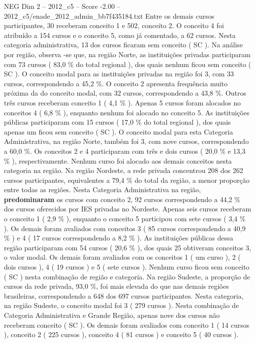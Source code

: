 \begin{textsample}{NEG Dim 2 – 2012\_c5 – Score -2.00 – 2012\_c5/enade\_2012\_admin\_bb7f435184.txt}
Entre os demais cursos participantes, 30 receberam conceito 1 e 502, conceito 2.
O conceito 4 foi atribuído a 154 cursos e o conceito 5, como já comentado, a 62 cursos.
Nesta categoria administrativa, 13 dos cursos ficaram sem conceito ( SC ).
Na análise por região, observa -se que, na região Norte, as instituições privadas participaram com 73 cursos ( 83,0 \% do total regional ), dos quais nenhum ficou sem conceito ( SC ).
O conceito modal para as instituições privadas na região foi 3, com 33 cursos, correspondendo a 45,2 \%.
O conceito 2 apresenta frequência muito próxima da do conceito modal, com 32 cursos, correspondendo a 43,8 \%.
Outros três cursos receberam conceito 1 ( 4,1 \% ).
Apenas 5 cursos foram alocados no conceitos 4 ( 6,8 \% ), enquanto nenhum foi alocado no conceito 5.
As instituições públicas participaram com 15 cursos ( 17,0 \% do total regional ), dos quais apenas um ficou sem conceito ( SC ).
O conceito modal para esta Categoria Administrativa, na região Norte, também foi 3, com nove cursos, correspondendo a 60,0 \%.
Os conceitos 2 e 4 participaram com três e dois cursos ( 20,0 \% e 13,3 \% ), respectivamente.
Nenhum curso foi alocado aos demais conceitos nesta categoria na região.
Na região Nordeste, a rede privada concentrou 208 dos 262 cursos participantes, equivalentes a 79,4 \% do total da região, a menor proporção entre todas as regiões.
Nesta Categoria Administrativa na região, \textbf{predominaram} os cursos com conceito 2, 92 cursos correspondendo a 44,2 \% dos cursos oferecidos por IES privadas no Nordeste.
Apenas seis cursos receberam o conceito 1 ( 2,9 \% ), enquanto o conceito 5 participou com sete cursos ( 3,4 \% ).
Os demais foram avaliados com conceitos 3 ( 85 cursos correspondendo a 40,9 \% ) e 4 ( 17 cursos correspondendo a 8,2 \% ).
As instituições públicas dessa região participaram com 54 cursos ( 20,6 \% ), dos quais 25 obtiveram conceitos 3, o valor modal.
Os demais foram avaliados com os conceitos 1 ( um curso ), 2 ( dois cursos ), 4 ( 19 cursos ) e 5 ( sete cursos ).
Nenhum curso ficou sem conceito ( SC ) nesta combinação de região e categoria.
Na região Sudeste, a proporção de cursos da rede privada, 93,0 \%, foi mais elevada do que nas demais regiões brasileiras, correspondendo a 648 dos 697 cursos participantes.
Nesta categoria, na região Sudeste, o conceito modal foi 3 ( 279 cursos ).
Nesta combinação de Categoria Administrativa e Grande Região, apenas nove dos cursos não receberam conceito ( SC ).
Os demais foram avaliados com conceito 1 ( 14 cursos ), conceito 2 ( 225 cursos ), conceito 4 ( 81 cursos ) e conceito 5 ( 40 cursos ).

\end{textsample}
